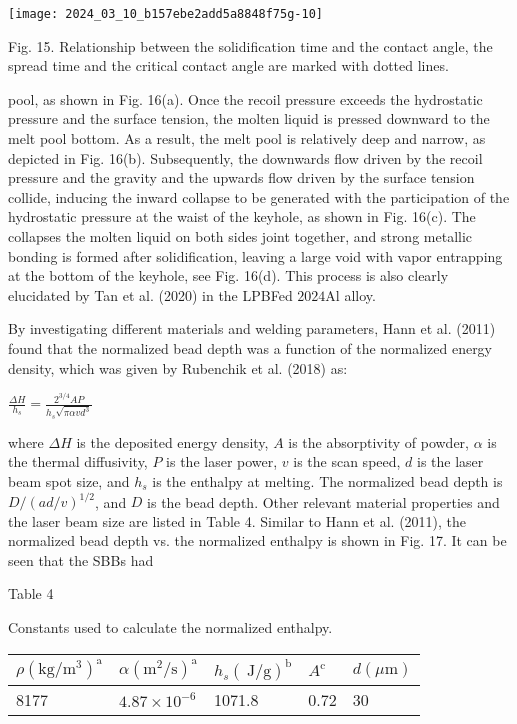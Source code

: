 \documentclass[10pt]{article}
\begin{document}
\begin{center}
\texttt{[image: 2024\_03\_10\_b157ebe2add5a8848f75g-10]}
\end{center}

Fig. 15. Relationship between the solidification time and the contact angle, the spread time and the critical contact angle are marked with dotted lines.

pool, as shown in Fig. 16(a). Once the recoil pressure exceeds the hydrostatic pressure and the surface tension, the molten liquid is pressed downward to the melt pool bottom. As a result, the melt pool is relatively deep and narrow, as depicted in Fig. 16(b). Subsequently, the downwards flow driven by the recoil pressure and the gravity and the upwards flow driven by the surface tension collide, inducing the inward collapse to be generated with the participation of the hydrostatic pressure at the waist of the keyhole, as shown in Fig. 16(c). The collapses the molten liquid on both sides joint together, and strong metallic bonding is formed after solidification, leaving a large void with vapor entrapping at the bottom of the keyhole, see Fig. 16(d). This process is also clearly elucidated by Tan et al. (2020) in the LPBFed $2024 \mathrm{Al}$ alloy.

By investigating different materials and welding parameters, Hann et al. (2011) found that the normalized bead depth was a function of the normalized energy density, which was given by Rubenchik et al. (2018) as:

$\frac{\Delta H}{h_{s}}=\frac{2^{3 / 4} A P}{h_{s} \sqrt{\pi \alpha v d^{3}}}$

where $\Delta H$ is the deposited energy density, $A$ is the absorptivity of powder, $\alpha$ is the thermal diffusivity, $P$ is the laser power, $v$ is the scan speed, $d$ is the laser beam spot size, and $h_{s}$ is the enthalpy at melting. The normalized bead depth is $D /(a d / v)^{1 / 2}$, and $D$ is the bead depth. Other relevant material properties and the laser beam size are listed in Table 4. Similar to Hann et al. (2011), the normalized bead depth vs. the normalized enthalpy is shown in Fig. 17. It can be seen that the SBBs had

Table 4

Constants used to calculate the normalized enthalpy.

\begin{center}
\begin{tabular}{lllll}
\hline
$\rho\left(\mathrm{kg} / \mathrm{m}^{3}\right)^{\mathrm{a}}$ & $\alpha\left(\mathrm{m}^{2} / \mathrm{s}\right)^{\mathrm{a}}$ & $h_{s}(\mathrm{~J} / \mathrm{g})^{\mathrm{b}}$ & $A^{\mathrm{c}}$ & $d(\mu \mathrm{m})$ \\
\hline
8177 & $4.87 \times 10^{-6}$ & 1071.8 & 0.72 & 30 \\
\hline
\end{tabular}
\end{center}
\end{document}
